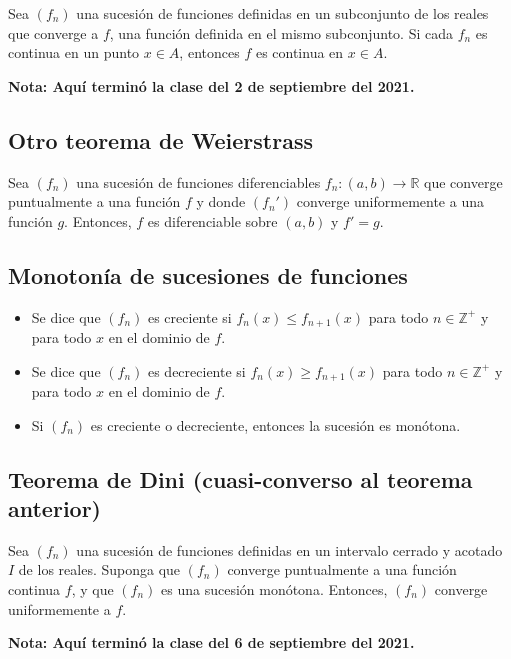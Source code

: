 \documentclass{article}
\begin{document}
Sea $(f_n)$ una sucesión de funciones definidas en un subconjunto de los reales que converge a $f$, una función definida en el mismo subconjunto. Si cada $f_n$ es continua en un punto $x\in A$, entonces $f$ es continua en $x\in A$.

\vspace{10pt}
\textbf{Nota: Aquí terminó la clase del 2 de septiembre del 2021.}

\subsection*{Otro teorema de Weierstrass}

Sea $(f_n)$ una sucesión de funciones diferenciables $f_n:(a,b)\to\mathbb{R}$ que converge puntualmente a una función $f$ y donde $(f_n')$ converge uniformemente a una función $g$. Entonces, $f$ es diferenciable sobre $(a,b)$ y $f'=g$.

\subsection*{Monotonía de sucesiones de funciones}

\begin{itemize}
\item Se dice que $(f_n)$ es creciente si $f_n(x)\leq f_{n+1}(x)$ para todo $n\in\mathbb{Z}^{+}$ y para todo $x$ en el dominio de $f$.

\item Se dice que $(f_n)$ es decreciente si $f_n(x)\geq f_{n+1}(x)$ para todo $n\in\mathbb{Z}^{+}$ y para todo $x$ en el dominio de $f$.

\item Si $(f_n)$ es creciente o decreciente, entonces la sucesión es monótona.
\end{itemize}

\subsection*{Teorema de Dini (cuasi-converso al teorema anterior)}

Sea $(f_n)$ una sucesión de funciones definidas en un intervalo cerrado y acotado $I$ de los reales. Suponga que $(f_n)$ converge puntualmente a una función continua $f$, y que $(f_n)$ es una sucesión monótona. Entonces, $(f_n)$ converge uniformemente a $f$.

\vspace{10pt}
\textbf{Nota: Aquí terminó la clase del 6 de septiembre del 2021.}
\end{document}
